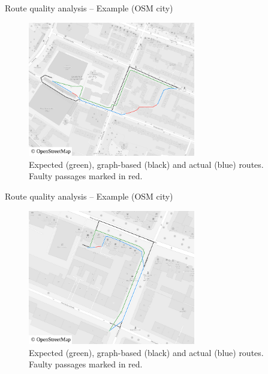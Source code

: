 \documentclass[xcolor={x11names}]{beamer}
\newenvironment{figcenter}
{%
	\parskip=0pt%
	\par%
	\nopagebreak%
	\centering%
}%
{%
	\par%
	\noindent%
	\ignorespacesafterend%
}
\begin{document}
		\begin{frame}{Route quality analysis -- Example (OSM city)}
			\begin{figure}
				\begin{figcenter}
					\includegraphics[width=0.65\textwidth]{../thesis/images/qgis-routing-city-routing-6.pdf}
				\end{figcenter}
				\caption{Expected (green), graph-based (black) and actual (blue) routes. Faulty passages marked in red.}
			\end{figure}
		\end{frame}
		
		\begin{frame}{Route quality analysis -- Example (OSM city)}
			\begin{figure}
				\begin{figcenter}
					\includegraphics[width=0.65\textwidth]{../thesis/images/qgis-routing-city-routing-1.pdf}
				\end{figcenter}
				\caption{Expected (green), graph-based (black) and actual (blue) routes. Faulty passages marked in red.}
			\end{figure}
		\end{frame}
		
\end{document}
